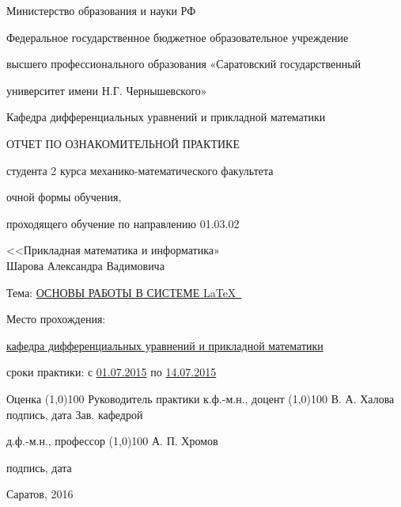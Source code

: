 \newcommand{\toCenter}[1]{\begin{center}#1\par\end{center}}
\newcommand{\toRight}[1]{\begin{flushright}#1\par\end{flushright}}
\newcommand{\toLeft}[1]{\begin{flushleft}#1\par\end{flushleft}}

\begin{titlepage} 

\thispagestyle{empty} 
\centerline{Министерство образования и науки РФ} 
\centerline{Федеральное государственное бюджетное образовательное учреждение} 
\centerline{высшего профессионального образования «Саратовский государственный} 
\centerline{университет имени Н.Г. Чернышевского»}

\medskip

\toRight{Кафедра дифференциальных уравнений и прикладной математики}

\begin{center}
\large ОТЧЕТ ПО ОЗНАКОМИТЕЛЬНОЙ ПРАКТИКЕ
\medskip

студента 2 курса механико-математического факультета

очной формы обучения,

проходящего обучение по направлению 01.03.02 

<<Прикладная математика и информатика» \\
Шарова Александра Вадимовича
\medskip
\end{center}
Тема: \underline{ОСНОВЫ РАБОТЫ В СИСТЕМЕ \LaTeX\ }
\medskip
\toLeft{

Место прохождения:

\underline{кафедра дифференциальных уравнений и прикладной  математики}
\bigskip

сроки практики: с \underline{01.07.2015} по \underline{14.07.2015}
\vspace{2cm}

Оценка \line(1,0){100}
Руководитель практики
к.ф.-м.н., доцент \hspace{2.6cm} \line(1,0){100} \hspace{1.5cm} В. А. Халова
\hspace{6.8cm}подпись, дата
\bigskip
Зав. кафедрой

д.ф.-м.н., профессор \hspace{1.8cm} \line(1,0){100} \hspace{1.5cm} А. П. Хромов

\hspace{6.8cm}подпись, дата
}
\vfill
\vfill%
\toCenter{Саратов, 2016}
\clearpage 
\end{titlepage} 